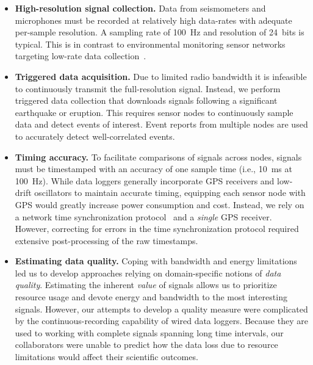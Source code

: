 \begin{itemize}

\item \textbf{High-resolution signal collection.} Data from seismometers and
microphones must be recorded at relatively high data-rates with adequate
per-sample resolution. A sampling rate of 100~Hz and resolution of 24~bits is
typical. This is in contrast to environmental monitoring sensor networks
targeting low-rate data collection~\cite{gdi-sensys04,berkeley-redwoods}.

\item \textbf{Triggered data acquisition.} Due to limited radio bandwidth it
is infeasible to continuously transmit the full-resolution signal. Instead,
we perform triggered data collection that downloads signals following a
significant earthquake or eruption. This requires sensor nodes to
continuously sample data and detect events of interest. Event reports from
multiple nodes are used to accurately detect well-correlated events.

\item \textbf{Timing accuracy.} To facilitate comparisons of signals across
nodes, signals must be timestamped with an accuracy of one sample time (i.e.,
10~ms at 100~Hz). While data loggers generally incorporate GPS receivers and
low-drift oscillators to maintain accurate timing, equipping each sensor node
with GPS would greatly increase power consumption and cost. Instead, we rely
on a network time synchronization protocol~\cite{rbs,ftsp} and a
\textit{single} GPS receiver. However, correcting for errors in the time
synchronization protocol required extensive post-processing of the raw
timestamps.

\item \textbf{Estimating data quality.} Coping with bandwidth and energy
limitations led us to develop approaches relying on domain-specific notions
of \textit{data quality}. Estimating the inherent \textit{value} of signals
allows us to prioritize resource usage and devote energy and bandwidth to the
most interesting signals. However, our attempts to develop a quality measure
were complicated by the continuous-recording capability of wired data
loggers. Because they are used to working with complete signals spanning long
time intervals, our collaborators were unable to predict how the data loss
due to resource limitations would affect their scientific outcomes.

\end{itemize}


